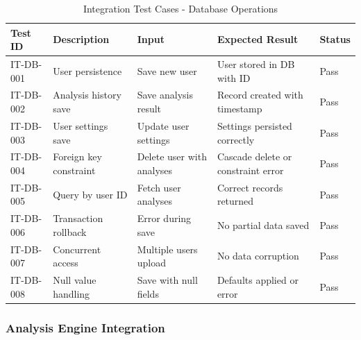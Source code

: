 \documentclass[12pt,a4paper]{article}
\begin{document}
    \begin{table}[H]
        \caption{Integration Test Cases - Database Operations}
        \begin{tabular}{|p{2cm}|p{4cm}|p{3cm}|p{3cm}|p{1.5cm}|}
            \hline
            \textbf{Test ID} & \textbf{Description} & \textbf{Input} & \textbf{Expected Result} & \textbf{Status} \\
            \hline
            IT-DB-001 & User persistence & Save new user & User stored in DB with ID & Pass \\
            \hline
            IT-DB-002 & Analysis history save & Save analysis result & Record created with timestamp & Pass \\
            \hline
            IT-DB-003 & User settings save & Update user settings & Settings persisted correctly & Pass \\
            \hline
            IT-DB-004 & Foreign key constraint & Delete user with analyses & Cascade delete or constraint error & Pass \\
            \hline
            IT-DB-005 & Query by user ID & Fetch user analyses & Correct records returned & Pass \\
            \hline
            IT-DB-006 & Transaction rollback & Error during save & No partial data saved & Pass \\
            \hline
            IT-DB-007 & Concurrent access & Multiple users upload & No data corruption & Pass \\
            \hline
            IT-DB-008 & Null value handling & Save with null fields & Defaults applied or error & Pass \\
            \hline
        \end{tabular}
    \end{table}

    \subsubsection{Analysis Engine Integration}
\end{document}
